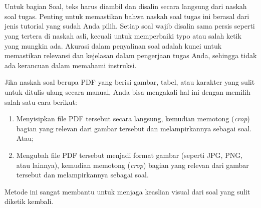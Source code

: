 %
%
%
\chapter{\Soal}


Untuk bagian Soal, teks harus diambil dan disalin secara langsung dari naskah soal tugas. Penting untuk memastikan bahwa naskah soal tugas ini berasal dari jenis tutorial yang sudah Anda pilih. Setiap soal wajib disalin sama persis seperti yang tertera di naskah asli, kecuali untuk memperbaiki typo atau salah ketik yang mungkin ada. Akurasi dalam penyalinan soal adalah kunci untuk memastikan relevansi dan kejelasan dalam pengerjaan tugas Anda, sehingga tidak ada kerancuan dalam memahami instruksi.

Jika naskah soal berupa PDF yang berisi gambar, tabel, atau karakter yang sulit untuk ditulis ulang secara manual, Anda bisa mengakali hal ini dengan memilih salah satu cara berikut: 

\begin{enumerate}
    \item Menyisipkan file PDF tersebut secara langsung, kemudian memotong (\textit{crop}) bagian yang relevan dari gambar tersebut dan melampirkannya sebagai soal. Atau;
    \item Mengubah file PDF tersebut menjadi format gambar (seperti JPG, PNG, atau lainnya), kemudian memotong (\textit{crop}) bagian yang relevan dari gambar tersebut dan melampirkannya sebagai soal.
\end{enumerate}

Metode ini sangat membantu untuk menjaga keaslian visual dari soal yang sulit diketik kembali.